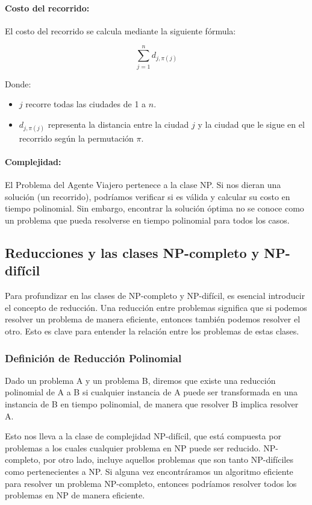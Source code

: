 \documentclass[12pt,titlepage,twoside,openright]{book}
\begin{document}
\paragraph{Costo del recorrido:}
El costo del recorrido se calcula mediante la siguiente f\'ormula:

\[
\sum_{j=1}^n d_{j,\pi(j)}
\]

Donde:
\begin{itemize}
    \item $j$ recorre todas las ciudades de 1 a $n$.
    \item $d_{j,\pi(j)}$ representa la distancia entre la ciudad $j$ y la ciudad que le sigue en el recorrido seg\'un la permutaci\'on $\pi$.
\end{itemize}

\paragraph{Complejidad:}
El Problema del Agente Viajero pertenece a la clase NP. Si nos dieran una soluci\'on (un recorrido), podr\'iamos verificar si es v\'alida y calcular su costo en tiempo polinomial. Sin embargo, encontrar la soluci\'on \'optima no se conoce como un problema que pueda resolverse en tiempo polinomial para todos los casos.

\subsection{Reducciones y las clases NP-completo y NP-dif\'icil}

Para profundizar en las clases de NP-completo y NP-dif\'icil, es esencial introducir el concepto de reducci\'on. Una reducci\'on entre problemas significa que si podemos resolver un problema de manera eficiente, entonces tambi\'en podemos resolver el otro. Esto es clave para entender la relaci\'on entre los problemas de estas clases.

\subsubsection{Definici\'on de Reducci\'on Polinomial}

Dado un problema A y un problema B, diremos que existe una reducci\'on polinomial de A a B si cualquier instancia de A puede ser transformada en una instancia de B en tiempo polinomial, de manera que resolver B implica resolver A.

Esto nos lleva a la clase de complejidad NP-dif\'icil, que est\'a compuesta por problemas a los cuales cualquier problema en NP puede ser reducido. NP-completo, por otro lado, incluye aquellos problemas que son tanto NP-dif\'iciles como pertenecientes a NP. Si alguna vez encontr\'aramos un algoritmo eficiente para resolver un problema NP-completo, entonces podr\'iamos resolver todos los problemas en NP de manera eficiente.
\end{document}
